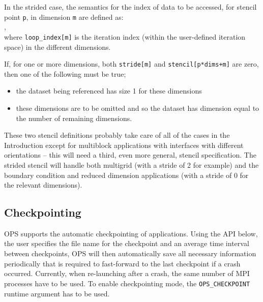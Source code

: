 \documentclass[11pt]{article}
\begin{document}
\vspace{0.2in}

\noindent In the strided case, the semantics for the index of data to be accessed, for stencil point {\tt p}, in dimension \texttt{m} are defined as:\\

,\\

\noindent where \texttt{loop\_index[m]} is the iteration index (within the user-defined iteration space) in the different dimensions.

\noindent If, for one or more dimensions, both {\tt stride[m]} and {\tt stencil[p*dims+m]} are zero, then one of the
following must be true;
\begin{itemize}
\item
the dataset being referenced has size 1 for these dimensions
\item
these dimensions are to be omitted and so the dataset has 
dimension equal to the number of remaining dimensions.
\end{itemize}

\noindent These two stencil definitions probably take care of all of the cases in the Introduction except for 
multiblock applications with interfaces with different orientations -- this will need a third, even more general, 
stencil specification. \noindent The strided stencil will handle both multigrid (with a stride of 2 for example) and 
the boundary condition and reduced dimension applications (with a stride of 0 for the relevant dimensions).

\subsection{Checkpointing}
OPS supports the automatic checkpointing of applications. Using the API below, the user specifies the file name for the 
checkpoint and an average time interval between checkpoints, OPS will then automatically save all necessary information 
periodically that is required to fast-forward to the last checkpoint if a crash occurred. Currently, when re-launching 
after a crash, the same number of MPI processes have to be used. To enable checkpointing mode, the {\tt OPS\_CHECKPOINT} 
runtime argument has to be used.\\
\end{document}
